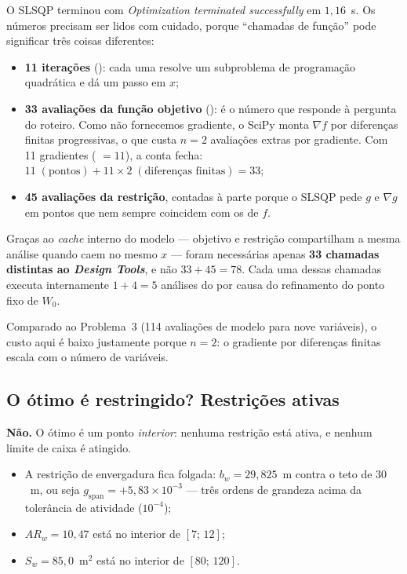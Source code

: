 O SLSQP terminou com \emph{Optimization terminated successfully} em
$1{,}16$~s. Os números precisam ser lidos com cuidado, porque
``chamadas de função'' pode significar três coisas diferentes:

\begin{itemize}
\item \textbf{11 iterações} (): cada uma resolve um subproblema
      de programação quadrática e dá um passo em $x$;
\item \textbf{33 avaliações da função objetivo} (): é o número
      que responde à pergunta do roteiro. Como não fornecemos gradiente,
      o SciPy monta $\nabla f$ por diferenças finitas progressivas, o que
      custa $n = 2$ avaliações extras por gradiente. Com 11 gradientes
      ( $= 11$), a conta fecha:
      $11\;(\text{pontos}) + 11\times 2\;(\text{diferenças finitas}) = 33$;
\item \textbf{45 avaliações da restrição}, contadas à parte porque o
      SLSQP pede $g$ e $\nabla g$ em pontos que nem sempre coincidem com
      os de $f$.
\end{itemize}

Graças ao \emph{cache} interno do modelo --- objetivo e restrição
compartilham a mesma análise quando caem no mesmo $x$ --- foram
necessárias apenas \textbf{33 chamadas distintas ao \emph{Design
Tools}}, e não $33 + 45 = 78$. Cada uma dessas chamadas executa
internamente $1 + 4 = 5$ análises do  por causa do
refinamento do ponto fixo de $W_0$.

Comparado ao Problema~3 (114 avaliações de modelo para nove variáveis), o
custo aqui é baixo justamente porque $n = 2$: o gradiente por diferenças
finitas escala com o número de variáveis.

\subsection{O ótimo é restringido? Restrições ativas}
\label{sec:p2q4}

\textbf{Não.} O ótimo é um ponto \emph{interior}: nenhuma restrição está
ativa, e nenhum limite de caixa é atingido.

\begin{itemize}
\item A restrição de envergadura fica folgada:
      $b_w = 29{,}825$~m contra o teto de $30$~m, ou seja
      $g_{\mathrm{span}} = +5{,}83\times 10^{-3}$ --- três ordens de
      grandeza acima da tolerância de atividade ($10^{-4}$);
\item $AR_w = 10{,}47$ está no interior de $[7;\,12]$;
\item $S_w = 85{,}0$~m$^2$ está no interior de $[80;\,120]$.
\end{itemize}

